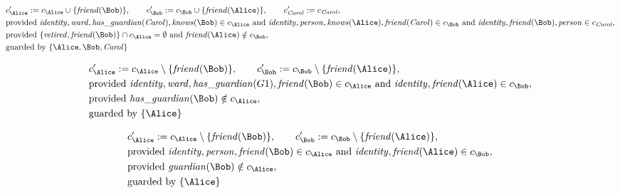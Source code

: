 \begin{align*}
&
c'_
{
\Alice
}
 := 
c_
{
\Alice
}
 \cup 
\{
\mathit{\detokenize{
friend
}}
(
\Bob
)
\}
, \qquad 
c'_
{
\Bob
}
 := 
c_
{
\Bob
}
 \cup 
\{
\mathit{\detokenize{
friend
}}
(
\Alice
)
\}
, \qquad 
c'_
{
\mathit{Carol}
}
 := 
c_
{
\mathit{Carol}
}
,\\
&
\text{provided } 
\mathit{\detokenize{
identity
}}
,
\mathit{\detokenize{
ward
}}
,
\mathit{\detokenize{
has_guardian
}}
(
\mathit{Carol}
)
,
\mathit{\detokenize{
knows
}}
(
\Bob
)
 \in c_
{
\Alice
}
 \text{ and } 
\mathit{\detokenize{
identity
}}
,
\mathit{\detokenize{
person
}}
,
\mathit{\detokenize{
knows
}}
(
\Alice
)
,
\mathit{\detokenize{
friend
}}
(
\mathit{Carol}
)
 \in c_
{
\Bob
}
 \text{ and } 
\mathit{\detokenize{
identity
}}
,
\mathit{\detokenize{
friend
}}
(
\Bob
)
,
\mathit{\detokenize{
person
}}
 \in c_
{
\mathit{Carol}
}
,\\
&
\text{provided } 
\{
\mathit{\detokenize{
retired
}}
,
\mathit{\detokenize{
friend
}}
(
\Bob
)
\}
 \cap c_
{
\Alice
}
 = \emptyset
 \text{ and } 
\mathit{\detokenize{
friend
}}
(
\Alice
)
 \notin c_
{
\Bob
}
,\\
&
\text{guarded by } \{
\Alice
,
\Bob
,
\mathit{Carol}
\}
\end{align*}

\begin{align*}
&
c'_
{
\Alice
}
 := 
c_
{
\Alice
}
 \setminus 
\{
\mathit{\detokenize{
friend
}}
(
\Bob
)
\}
, \qquad 
c'_
{
\Bob
}
 := 
c_
{
\Bob
}
 \setminus 
\{
\mathit{\detokenize{
friend
}}
(
\Alice
)
\}
,\\
&
\text{provided } 
\mathit{\detokenize{
identity
}}
,
\mathit{\detokenize{
ward
}}
,
\mathit{\detokenize{
has_guardian
}}
(
G1
)
,
\mathit{\detokenize{
friend
}}
(
\Bob
)
 \in c_
{
\Alice
}
 \text{ and } 
\mathit{\detokenize{
identity
}}
,
\mathit{\detokenize{
friend
}}
(
\Alice
)
 \in c_
{
\Bob
}
,\\
&
\text{provided } 
\mathit{\detokenize{
has_guardian
}}
(
\Bob
)
 \notin c_
{
\Alice
}
,\\
&
\text{guarded by } \{
\Alice
\}
\end{align*}

\begin{align*}
&
c'_
{
\Alice
}
 := 
c_
{
\Alice
}
 \setminus 
\{
\mathit{\detokenize{
friend
}}
(
\Bob
)
\}
, \qquad 
c'_
{
\Bob
}
 := 
c_
{
\Bob
}
 \setminus 
\{
\mathit{\detokenize{
friend
}}
(
\Alice
)
\}
,\\
&
\text{provided } 
\mathit{\detokenize{
identity
}}
,
\mathit{\detokenize{
person
}}
,
\mathit{\detokenize{
friend
}}
(
\Bob
)
 \in c_
{
\Alice
}
 \text{ and } 
\mathit{\detokenize{
identity
}}
,
\mathit{\detokenize{
friend
}}
(
\Alice
)
 \in c_
{
\Bob
}
,\\
&
\text{provided } 
\mathit{\detokenize{
guardian
}}
(
\Bob
)
 \notin c_
{
\Alice
}
,\\
&
\text{guarded by } \{
\Alice
\}
\end{align*}

